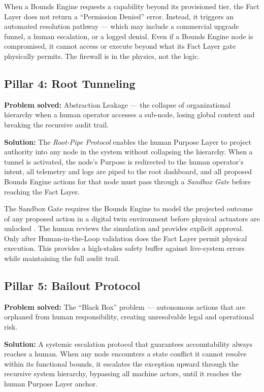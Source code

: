 \documentclass[12pt]{article}
\begin{document}
When a Bounds Engine requests a capability beyond its provisioned tier, the Fact Layer does not return a ``Permission Denied'' error. Instead, it triggers an automated resolution pathway --- which may include a commercial upgrade funnel, a human escalation, or a logged denial. Even if a Bounds Engine node is compromised, it cannot access or execute beyond what its Fact Layer gate physically permits. The firewall is in the physics, not the logic.

\subsection{Pillar 4: Root Tunneling}

\textbf{Problem solved:} Abstraction Leakage --- the collapse of organizational hierarchy when a human operator accesses a sub-node, losing global context and breaking the recursive audit trail.

\textbf{Solution:} The \textit{Root-Pipe Protocol} enables the human Purpose Layer to project authority into any node in the system without collapsing the hierarchy. When a tunnel is activated, the node's Purpose is redirected to the human operator's intent, all telemetry and logs are piped to the root dashboard, and all proposed Bounds Engine actions for that node must pass through a \textit{Sandbox Gate} before reaching the Fact Layer.

The Sandbox Gate requires the Bounds Engine to model the projected outcome of any proposed action in a digital twin environment before physical actuators are unlocked \cite{leveson2011}. The human reviews the simulation and provides explicit approval. Only after Human-in-the-Loop validation does the Fact Layer permit physical execution. This provides a high-stakes safety buffer against live-system errors while maintaining the full audit trail.

\subsection{Pillar 5: Bailout Protocol}

\textbf{Problem solved:} The ``Black Box'' problem --- autonomous actions that are orphaned from human responsibility, creating unresolvable legal and operational risk.

\textbf{Solution:} A systemic escalation protocol that guarantees accountability always reaches a human. When any node encounters a state conflict it cannot resolve within its functional bounds, it escalates the exception upward through the recursive system hierarchy, bypassing all machine actors, until it reaches the human Purpose Layer anchor.
\end{document}
